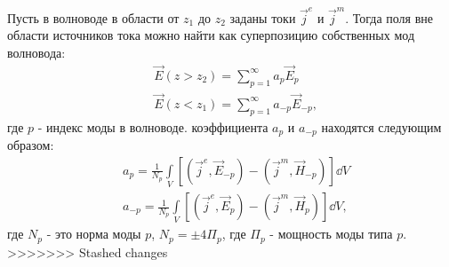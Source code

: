 \documentclass[a4paper,14pt]{extarticle}
\begin{document}
	Пусть в волноводе в области от $z_1$ до $z_2$ заданы токи $\vec{j}^e$ и $\vec{j}^m$. Тогда поля вне области источников тока можно найти как
	суперпозицию собственных мод волновода:
	\begin{align*}
		&\vec{E}(z>z_2) = \sum \limits_{p=1}^{\infty}a_p\vec{E}_p\\
		&\vec{E}(z<z_1) = \sum \limits_{p=1}^{\infty}a_{-p}\vec{E}_{-p}	,	
	\end{align*}
	где $p$ - индекс моды в волноводе. коэффициента $a_p$ и $a_{-p}$ находятся следующим образом:
	\begin{align*}
		&a_p = \frac{1}{N_p}\int\limits_V\left[ (\vec{j}^e,\vec{E}_{-p})-(\vec{j}^m,\vec{H}_{-p}) \right]\dd V\\
		&a_{-p} = \frac{1}{N_p}\int\limits_V\left[ (\vec{j}^e,\vec{E}_{p})-(\vec{j}^m,\vec{H}_{p}) \right]\dd V,
	\end{align*}
	где $N_p$ - это норма моды $p$, $N_p=\pm4\Pi_p$, где $\Pi_p$ - мощность моды типа $p$.
>>>>>>> Stashed changes
\end{document}

